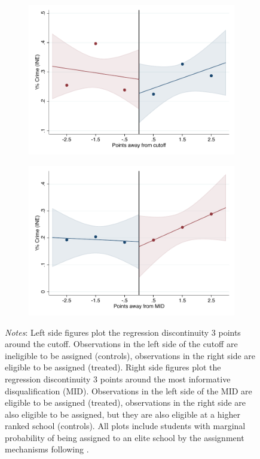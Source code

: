 \documentclass[oneside,11pt]{article}
\begin{document}
\begin{figure}[H]
\begin{center}
    \begin{subfigure}{0.475\textwidth}
        \centering
        \includegraphics[width=\textwidth]{04_Figures/rd_plot_tau_Suspencion_INE_IPN3.pdf}
    \end{subfigure}
    \begin{subfigure}{0.475\textwidth}
        \centering
        \includegraphics[width=\textwidth]{04_Figures/rd_plot_mid_Suspencion_INE_IPN3.pdf}
    \end{subfigure}
    \end{center}
    
\footnotesize
\textit{Notes}: Left side figures plot the regression discontinuity 3 points around the cutoff. Observations in the left side of the cutoff are ineligible to be assigned (controls), observations in the right side are eligible to be assigned (treated). Right side figures plot the regression discontinuity 3 points around the most informative disqualification (MID). Observations in the left side of the MID are eligible to be assigned (treated), observations in the right side are also eligible to be assigned, but they are also eligible at a higher ranked school (controls). All plots include students with marginal probability of being assigned to an elite school by the assignment mechanisms following \citet{abdulkadirouglu2022breaking}. 
\end{figure}
\end{document}
